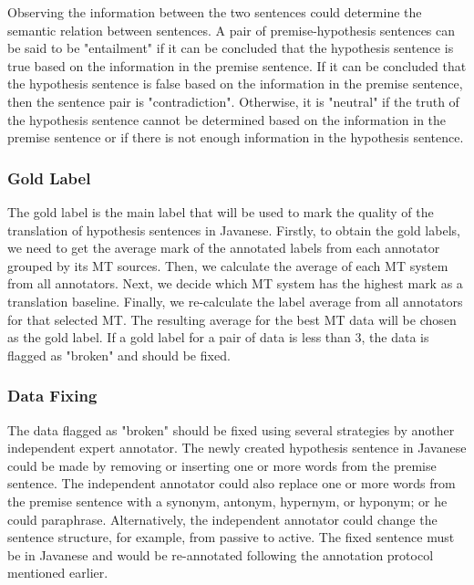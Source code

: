 \documentclass[a4paper, conference]{IEEEtran}
\begin{document}
Observing the information between the two sentences could determine the semantic relation between sentences. A pair of premise-hypothesis sentences can be said to be "entailment" if it can be concluded that the hypothesis sentence is true based on the information in the premise sentence. If it can be concluded that the hypothesis sentence is false based on the information in the premise sentence, then the sentence pair is "contradiction". Otherwise, it is "neutral" if the truth of the hypothesis sentence cannot be determined based on the information in the premise sentence or if there is not enough information in the hypothesis sentence.

\subsubsection{Gold Label}\label{goldLabel}
The gold label is the main label that will be used to mark the quality of the translation of hypothesis sentences in Javanese. Firstly, to obtain the gold labels, we need to get the average mark of the annotated labels from each annotator grouped by its MT sources. Then, we calculate the average of each MT system from all annotators. Next, we decide which MT system has the highest mark as a translation baseline. Finally, we re-calculate the label average from all annotators for that selected MT. The resulting average for the best MT data will be chosen as the gold label. If a gold label for a pair of data is less than $3$, the data is flagged as "broken" and should be fixed.

\subsubsection{Data Fixing}\label{dataFixing}
The data flagged as "broken" should be fixed using several strategies by another independent expert annotator. The newly created hypothesis sentence in Javanese could be made by removing or inserting one or more words from the premise sentence. The independent annotator could also replace one or more words from the premise sentence with a synonym, antonym, hypernym, or hyponym; or he could paraphrase. Alternatively, the independent annotator could change the sentence structure, for example, from passive to active. The fixed sentence must be in Javanese and would be re-annotated following the annotation protocol mentioned earlier.
\end{document}
